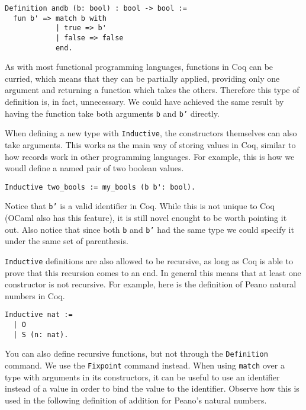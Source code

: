 \begin{verbatim}
Definition andb (b: bool) : bool -> bool :=
  fun b' => match b with 
            | true => b'
            | false => false
            end.
\end{verbatim}
\noindent As with most functional programming languages, functions in Coq can be curried, which means 
that they can be partially applied, providing only one argument and returning a function which takes 
the others. Therefore this type of definition is, in fact, unnecessary. We could have achieved the 
same result by having the function take both arguments \texttt{b} and \texttt{b'} 
directly.

When defining a new type with \texttt{Inductive}, the constructors themselves can also take 
arguments. This works as the main way of storing values in Coq, similar to how records work in other
programming languages. For example, this is how we woudl define a named pair of two boolean values.

\begin{verbatim}
Inductive two_bools := my_bools (b b': bool).
\end{verbatim}

Notice that \texttt{b'} is a valid identifier in Coq. While this is not unique to Coq (OCaml 
also has this feature), it is still novel enought to be worth pointing it out. Also notice that since 
both \texttt{b} and  \texttt{b'} had the same type we could specify it under the 
same set of parenthesis.

\texttt{Inductive} definitions are also allowed to be recursive, as long as Coq is able to 
prove that this recursion comes to an end. In general this means that at least one constructor is not 
recursive. For example, here is the definition of Peano natural numbers in Coq.

\begin{verbatim}
Inductive nat :=
  | O 
  | S (n: nat).
\end{verbatim}

You can also define recursive functions, but not through the \texttt{Definition} command. We 
use the \texttt{Fixpoint} command instead. When using \texttt{match} over a type 
with arguments in its constructors, it can be useful to use an identifier instead of a value in order 
to bind the value to the identifier. Observe how this is used in the following definition of addition
for Peano's natural numbers.

